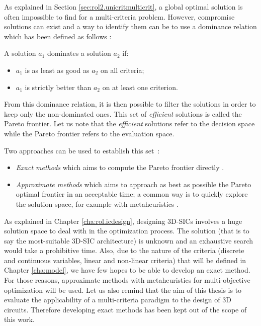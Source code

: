 As explained in Section \ref{sec:rol2.unicritmulticrit}, a global optimal solution is often impossible to find for a multi-criteria problem. However, compromise solutions can exist and a way to identify them can be to use a dominance relation which has been defined as follows \cite{BraMar2002}:

\begin{definition}[Dominance]
A solution $a_1$ dominates a solution $a_2$ if:
\begin{itemize}
\item $a_1$ is as least as good as $a_2$ on all criteria;
\item $a_1$ is strictly better than $a_2$ on at least one criterion.
\end{itemize}
\end{definition}

From this dominance relation, it is then possible to filter the solutions in order to keep only the non-dominated ones. This set of \emph{efficient} solutions is called the Pareto frontier. Let us note that the \emph{efficient} solutions refer to the decision space while the Pareto frontier refers to the evaluation space.

Two approaches can be used to establish this set~\cite{Vin92}:
\begin{itemize}
\item \textit{Exact methods} which aims to compute the Pareto frontier directly \cite{EhrgottGandibleuxbook02,steuer86a}.
\item \textit{Approximate methods} which aims to approach as best as possible the Pareto optimal frontier in an acceptable time; a common way is to quickly explore the solution space, for example with metaheuristics \cite{talbi09}.
\end{itemize}
As explained in Chapter \ref{cha:rol.icdesign}, designing 3D-SICs involves a huge solution space to deal with in the optimization process. The solution (that is to say the most-suitable 3D-SIC architecture) is unknown and an exhaustive search would take a prohibitive time. Also, due to the nature of the criteria (discrete and continuous variables, linear and non-linear criteria) that will be defined in Chapter \ref{cha:model}, we have few hopes to be able to develop an exact method. For those reasons, approximate methods with metaheuristics for multi-objective optimization will be used. Let us also remind that the aim of this thesis is to evaluate the applicability of a multi-criteria paradigm to the design of 3D circuits. Therefore developing exact methods has been kept out of the scope of this work.

